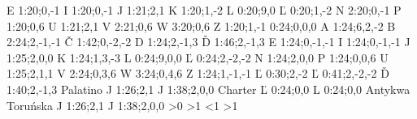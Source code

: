 \declCap E {1:20;0,-1}
\declCap I {1:20;0,-1}
\declCap J {1:21;2,1}
\declCap K {1:20;1,-2} 
\declCap L {0:20;9,0}
\declCap Ľ {0:20;1,-2}
\declCap N {2:20;0,-1}
\declCap P {1:20;0,6} 
\declCap U {1:21;2,1}
\declCap V {2:21;0,6}
\declCap W {3:20;0,6}
\declCap Z {1:20;1,-1}
\ifdim\hsize < \MinHsize
\declCap Č {-1.2:36;0,-2} \else 
\declCap Č {1:36;0,-2}
\fi
\ifnum{}
 {0:24;0,0,0}  %
\declCap A {1:24;6,2,-2}
\declCap B {2:24;2,-1,-1}
\declCap Č {1:42;0,-2,-2}
\declCap D {1:24;2,-1,3} 
\declCap Ď {1:46;2,-1,3}
\declCap E {1:24;0,-1,-1}
\declCap I {1:24;0,-1,-1}
\declCap J {1:25;2,0,0}
\declCap K {1:24;1,3,-3}
\declCap L {0:24;9,0,0}
\declCap Ľ {0:24;2,-2,-2}
\declCap N {1:24;2,0,0}
\declCap P {1:24;0,0,6}
\declCap U {1:25;2,1,1}
\declCap V {2:24;0,3,6}
\declCap W {3:24;0,4,6} 
\declCap Z {1:24;1,-1,-1}
\fi
\ifx\FontType\CMCS 
\declCap Ľ {0:30;2,-2}
\ifdim\hsize < \MinHsize 
\declCap Č {-1.2:31;0,-2} \else
\declCap Č {1:31;0,-2} \fi
\ifnum{}
\declCap Ľ {0:41;2,-2,-2}
\declCap Ď {1:40;2,-1,3}
\fi\fi
\def\tmp{Palatino}
\ifx\FontType\tmp
\declCap J {1:26;2,1}
\ifnum{}
\declCap J {1:38;2,0,0}
\fi\fi
\def\tmp{Charter}
\ifx\FontType\tmp
\ifnum{} \else
\declCap Ľ {0:24;0,0} \declCap L {0:24;0,0}
\fi\fi
\def\tmp{Antykwa To\-ru\'nska}
\ifx\FontType\tmp
\declCap J {1:26;2,1}
\ifnum{}
\declCap J {1:38;2,0,0}
\fi\fi
%
\def\CapIskip{} \def\CapIIskip{} 
\def\HIleftOff{} \def\HIIleftOff{} \def\HIleftOn{} \def\HIIleftOn{}
\ifnum\IfCapInsert>0 \let\nli\nl \let\CapIskip=\SmallSkip 
\let\HIleftOff=\HPleftOff \let\HIleftOn=\HPleftOn \else 
\def\nli{\nl\indent}\fi
\ifnum\IfCapInsert>1 \let\nlii\nl \let\CapIIskip=\SmallSkip 
\let\HIIleftOff=\HPleftOff \let\HIIleftOn=\HPleftOn \else 
\def\nlii{\nl\indent}\fi
\ifnum\IfCapInsert<1 \def\CapInsert{\noindent} \def\CapIInsert{\noindent} \else 
\ifnum\IfCapInsert>1 \let\CapInsert=\Capinsert \let\CapIInsert=\Capinsert  
\else                \let\CapInsert=\Capinsert \def\CapIInsert{\noindent}\fi\fi
